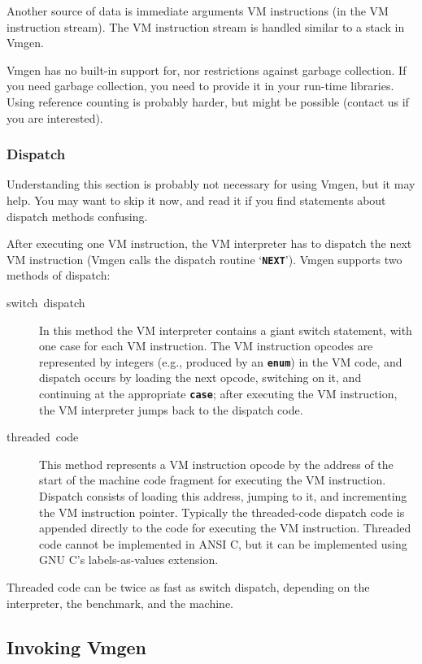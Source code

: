 \documentclass[10pt,english]{article}
\begin{document}
Another source of data is immediate arguments VM instructions (in
the VM instruction stream). The VM instruction stream is handled similar
to a stack in Vmgen.

Vmgen has no built-in support for, nor restrictions against garbage
collection. If you need garbage collection, you need to provide it
in your run-time libraries. Using reference counting is probably harder,
but might be possible (contact us if you are interested).


\subsubsection{Dispatch}

Understanding this section is probably not necessary for using Vmgen,
but it may help. You may want to skip it now, and read it if you find
statements about dispatch methods confusing.

After executing one VM instruction, the VM interpreter has to dispatch
the next VM instruction (Vmgen calls the dispatch routine \textquoteleft{}\texttt{\textbf{NEXT}}\textquoteright{}).
Vmgen supports two methods of dispatch:
\begin{description}
\item [{switch~dispatch}] In this method the VM interpreter contains a
giant switch statement, with one case for each VM instruction. The
VM instruction opcodes are represented by integers (e.g., produced
by an \texttt{\textbf{enum}}) in the VM code, and dispatch occurs
by loading the next opcode, switching on it, and continuing at the
appropriate \texttt{\textbf{case}}; after executing the VM instruction,
the VM interpreter jumps back to the dispatch code.
\item [{threaded~code}] This method represents a VM instruction opcode
by the address of the start of the machine code fragment for executing
the VM instruction. Dispatch consists of loading this address, jumping
to it, and incrementing the VM instruction pointer. Typically the
threaded-code dispatch code is appended directly to the code for executing
the VM instruction. Threaded code cannot be implemented in ANSI C,
but it can be implemented using GNU C's labels-as-values extension.
\end{description}
Threaded code can be twice as fast as switch dispatch, depending on
the interpreter, the benchmark, and the machine.


\subsection{Invoking Vmgen}
\end{document}
